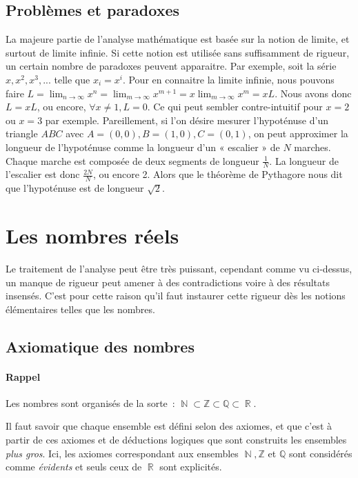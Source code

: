 \documentclass{article}
\DeclareMathOperator{\R}{\mathbb R}
\DeclareMathOperator{\N}{\mathbb N}
\theoremstyle{definition}
\theoremstyle{remark}
\begin{document}
	\subsection{Problèmes et paradoxes}
		La majeure partie de l'analyse mathématique est basée sur la notion de limite, et surtout de limite infinie. Si cette notion est utilisée sans
		suffisamment de rigueur, un certain nombre de paradoxes peuvent apparaitre. Par exemple, soit la série $x, x^2, x^3, ...$ telle que
		$x_i = x^i$. Pour en connaitre la limite infinie, nous pouvons faire $L = \lim_{n\to\infty}x^n = \lim_{m\to\infty}x^{m+1} = x\lim_{m\to\infty}x^m = xL$.
		Nous avons donc $L = xL$, ou encore, $\forall x\neq1, L = 0$. Ce qui peut sembler contre-intuitif pour $x = 2$ ou $x = 3$ par exemple.
		Pareillement, si l'on désire mesurer l'hypoténuse d'un triangle $ABC$ avec $A = (0, 0), B = (1, 0), C = (0, 1)$, on peut approximer la
		longueur de l'hypoténuse comme la longueur d'un « escalier » de $N$ marches. Chaque marche est composée de deux segments de longueur $\frac 1N$.
		La longueur de l'escalier est donc $\frac {2N}{N}$, ou encore 2. Alors que le théorème de Pythagore nous dit que l'hypoténuse est de longueur
		$\sqrt 2$.

\newpage
\section{Les nombres réels}
	Le traitement de l'analyse peut être très puissant, cependant comme vu ci-dessus, un manque de rigueur peut amener à des contradictions voire à
	des résultats insensés. C'est pour cette raison qu'il faut instaurer cette rigueur dès les notions élémentaires telles que les nombres.

	\subsection{Axiomatique des nombres}
		\paragraph{Rappel} Les nombres sont organisés de la sorte~: $\N \subset \mathbb Z\subset \mathbb Q \subset \R$.

		Il faut savoir que chaque ensemble est défini selon des axiomes, et que c'est à partir de ces axiomes et de déductions logiques que sont
		construits les ensembles \textit{plus gros}. Ici, les axiomes correspondant aux ensembles $\N, \mathbb Z$ et $\mathbb Q$ sont considérés
		comme \textit{évidents} et seuls ceux de $\R$ sont explicités.
\end{document}

